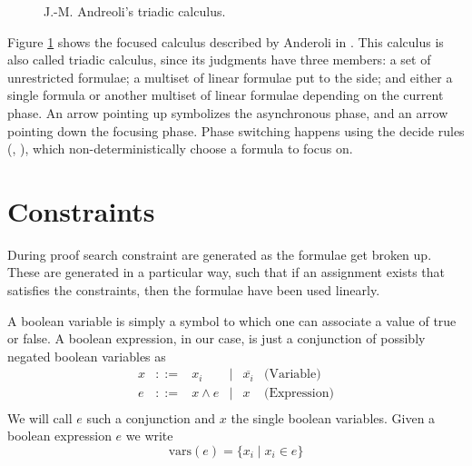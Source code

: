 \begin{figure}[h!]
	\centering
	
	\caption{J.-M. Andreoli's triadic calculus.\label{fig:triadic}}
\end{figure}
Figure \ref{fig:triadic} shows the focused calculus described by Anderoli in \cite{Focusing}.
This calculus is also called triadic calculus, since its judgments have three members: a set of unrestricted formulae; a multiset of linear formulae put to the side; and either a single formula or another multiset of linear formulae depending on the current phase.
An arrow pointing up symbolizes the asynchronous phase, and an arrow pointing down the focusing phase.
Phase switching happens using the decide rules (\derRule[A]{\displaydecide[1]}, \derRule[A]{\displaydecide[2]}), which non-deterministically choose a formula to focus on.

\section{Constraints}
During proof search constraint are generated as the formulae get broken up.
These are generated in a particular way, such that if an assignment exists that satisfies the constraints, then the formulae have been used linearly.
\begin{define}
	\label{def:bool expr}
	A boolean variable is simply a symbol to which one can associate a value of true or false.
	A boolean expression, in our case, is just a conjunction of possibly negated boolean variables as 
	$$\begin{array}{cccccr}
		x & ::=  & x_i &\mid& \overline{x_i} & \text{(Variable)}\\
		e & ::=  & x \wedge e    &\mid& x & \text{(Expression)} \\
	\end{array}$$
	We will call $e$ such a conjunction and $x$ the single boolean variables.
	Given a boolean expression $e$ we write
	$$ \mathrm{vars}(e) = \{ x_i \mid x_i \in e \} $$
\end{define}

